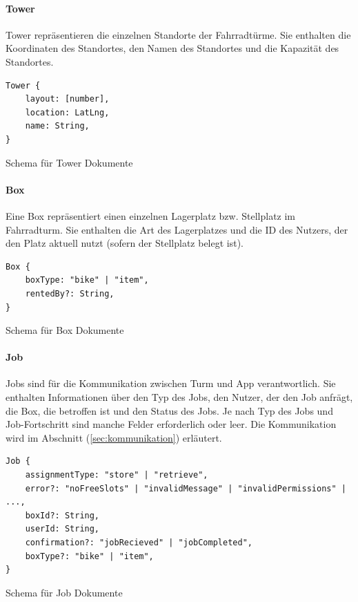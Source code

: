 \paragraph{Tower}
Tower repräsentieren die einzelnen Standorte der Fahrradtürme. Sie enthalten die Koordinaten des Standortes, den Namen des Standortes und die Kapazität des Standortes.

\begin{listing}[H]
    \begin{verbatim}
Tower {
    layout: [number],
    location: LatLng,
    name: String,
}
    \end{verbatim}
    \caption{Schema für Tower Dokumente}
    \label{lst:datenbankschema_tower}
\end{listing}

\paragraph{Box}
Eine Box repräsentiert einen einzelnen Lagerplatz bzw. Stellplatz im Fahrradturm. Sie enthalten die Art des Lagerplatzes und die ID des Nutzers, der den Platz aktuell nutzt (sofern der Stellplatz belegt ist).

\begin{listing}[H]
    \begin{verbatim}
Box {
    boxType: "bike" | "item",
    rentedBy?: String,
}
    \end{verbatim}
    \caption{Schema für Box Dokumente}
    \label{lst:datenbankschema_box}
\end{listing}


\paragraph{Job}
Jobs sind für die Kommunikation zwischen Turm und App verantwortlich. Sie enthalten Informationen über den Typ des Jobs, den Nutzer, der den Job anfrägt, die Box, die betroffen ist und den Status des Jobs. Je nach Typ des Jobs und Job-Fortschritt sind manche Felder erforderlich oder leer. Die Kommunikation wird im Abschnitt  (\ref{sec:kommunikation}) erläutert.

\begin{listing}[H]
    \begin{verbatim}
Job {
    assignmentType: "store" | "retrieve",
    error?: "noFreeSlots" | "invalidMessage" | "invalidPermissions" | ...,
    boxId?: String,
    userId: String,
    confirmation?: "jobRecieved" | "jobCompleted",
    boxType?: "bike" | "item",
}
\end{verbatim}
    \caption{Schema für Job Dokumente}
    \label{lst:datenbankstruktur_job}
\end{listing}

